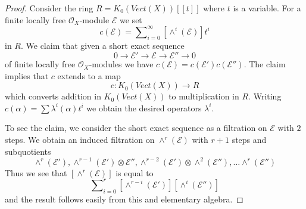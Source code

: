 \documentclass[10pt,a4paper]{amsart}
\theoremstyle{plain}
\theoremstyle{definition}
\theoremstyle{remark}
\numberwithin{equation}{subsection}
\begin{document}
\begin{proof}
Consider the ring $R = K_0(\textit{Vect}(X))[[t]]$ where $t$ is a
variable. For a finite locally free $\mathcal{O}_X$-module
$\mathcal{E}$ we set
$$
c(\mathcal{E}) = \sum\nolimits_{i = 0}^\infty [\wedge^i(\mathcal{E})] t^i
$$
in $R$. We claim that given a short exact sequence
$$
0 \to \mathcal{E}' \to \mathcal{E} \to \mathcal{E}'' \to 0
$$
of finite locally free $\mathcal{O}_X$-modules
we have $c(\mathcal{E}) = c(\mathcal{E}') c(\mathcal{E}'')$.
The claim implies that $c$ extends to a map
$$
c :  K_0(\textit{Vect}(X)) \longrightarrow R
$$
which converts addition in $K_0(\textit{Vect}(X))$ to multiplication in $R$.
Writing $c(\alpha) = \sum \lambda^i(\alpha) t^i$ we obtain the desired
operators $\lambda^i$.

\medskip\noindent
To see the claim, we consider the short exact sequence as a
filtration on $\mathcal{E}$ with $2$ steps. We obtain an induced
filtration on $\wedge^r(\mathcal{E})$ with $r + 1$ steps and
subquotients
$$
\wedge^r(\mathcal{E}'),
\wedge^{r - 1}(\mathcal{E}') \otimes \mathcal{E}'',
\wedge^{r - 2}(\mathcal{E}') \otimes \wedge^2(\mathcal{E}''), \ldots
\wedge^r(\mathcal{E}'')
$$
Thus we see that $[\wedge^r(\mathcal{E})]$ is equal to
$$
\sum\nolimits_{i = 0}^r
[\wedge^{r - i}(\mathcal{E}')] [\wedge^i(\mathcal{E}'')]
$$
and the result follows easily from this and elementary algebra.
\end{proof}
\end{document}
